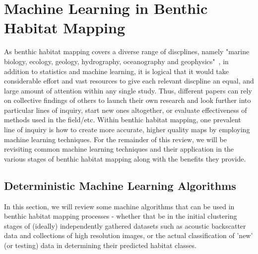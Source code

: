 \section{Machine Learning in Benthic Habitat Mapping}
As benthic habitat mapping covers a diverse range of discplines, namely "marine biology, ecology, geology, hydrography, oceanography and geophysics"~\citep{cjbrown11}, in addition to statistics and machine learning, it is logical that it would take considerable effort and vast resources to give each relevant discpline an equal, and large amount of attention within any single study. Thus, different papers can rely on collective findings of others to launch their own research and look further into particular lines of inquiry, start new ones altogether, or evaluate effectiveness of methods used in the field/etc. Within benthic habitat mapping, one prevalent line of inquiry is how to create more accurate, higher quality maps by employing machine learning techniques. For the remainder of this review, we will be revisiting common machine learning techniques and their application in the various stages of benthic habitat mapping along with the benefits they provide.

\subsection{Deterministic Machine Learning Algorithms}
In this section, we will review some machine algorithms that can be used in benthic habitat mapping processes - whether that be in the initial clustering stages of (ideally) independently gathered datasets such as acoustic backscatter data and collections of high resolution images, or the actual classification of 'new' (or testing) data in determining their predicted habitat classes.


